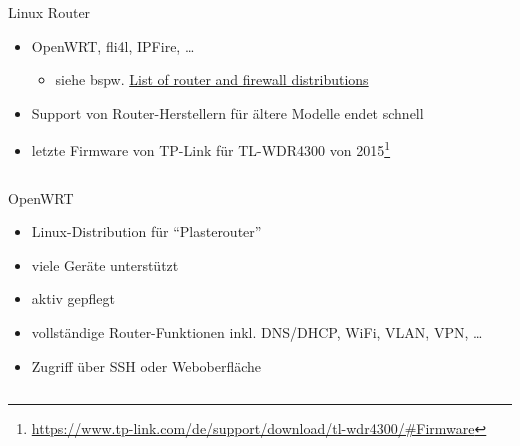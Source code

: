 \documentclass[t]{beamer}
\begin{document}
\begin{frame}{Linux Router}
    \begin{itemize}
        \item OpenWRT, fli4l, IPFire, …
            \begin{itemize}
                \item siehe bspw.  \href{https://en.wikipedia.org/wiki/List_of_router_and_firewall_distributions}{List of router and firewall distributions}
            \end{itemize}
        \item Support von Router-Herstellern für ältere Modelle endet
            schnell
        \item letzte Firmware von TP-Link für TL-WDR4300 von
            2015\footnote{\tiny\url{https://www.tp-link.com/de/support/download/tl-wdr4300/\#Firmware}}
    \end{itemize}
    \begin{columns}[b]
        \begin{column}{0.6\textwidth}
            \begin{block}{OpenWRT}
                \begin{itemize}
                    \item Linux-Distribution für \enquote{Plasterouter}
                    \item viele Geräte unterstützt
                    \item aktiv gepflegt
                    \item vollständige Router-Funktionen inkl. DNS/DHCP,
                        WiFi, VLAN, VPN, …
                    \item Zugriff über SSH oder Weboberfläche
                \end{itemize}
            \end{block}
        \end{column}
        \begin{column}{0.35\textwidth}
        \end{column}
    \end{columns}
\end{frame}
\end{document}
